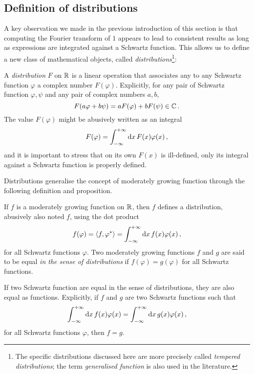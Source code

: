 \subsection{Definition of distributions}
A key observation we made in the previous introduction of this section is that computing
the Fourier transform of $1$ appears to lead to consistent results as long as expressions
are integrated against a Schwartz function. This allows us to define a new class of
mathematical objects, called \emph{distributions}\footnote{The specific distributions
  discussed here are more precisely called \emph{tempered distributions}; the term
\emph{generalised function} is also used in the literature.}:
\begin{definition}
  A \emph{distribution} $F$ on $\mathbb{R}$ is a linear operation that associates any to any
  Schwartz function $\varphi$ a complex number $F(\varphi)$. Explicitly, for any pair of
  Schwartz function $\varphi,\psi$ and any pair of complex numbers $a,b$,
  \begin{equation}
    F(a\varphi+b\psi)=aF(\varphi)+bF(\psi)\in\mathbb{C}\,.
  \end{equation}
  The value $F(\varphi)$ might be abusively written as an integral
  \begin{equation}
    F(\varphi)=\int_{-\infty}^{+\infty}\mathrm{d}{x}\,F(x)\varphi(x)\,,
  \end{equation}
  and it is important to stress that on its own $F(x)$ is ill-defined, only its integral
  against a Schwartz function is properly defined.
\end{definition}
Distributions generalise the concept of moderately growing function through the following
definition and proposition.
\begin{definition}
  If $f$ is a moderately growing function on $\mathbb{R}$, then $f$ defines a distribution,
  abusively also noted $f$, using the dot product
  \begin{equation}
    f(\varphi)=\braket{f,\varphi^*}=\int_{-\infty}^{+\infty}\mathrm{d}{x}\,f(x)\varphi(x)\,,
  \end{equation}
  for all Schwartz functions $\varphi$. Two moderately growing functions $f$ and $g$ are
  said to be equal \emph{in the sense of distributions} if $f(\varphi)=g(\varphi)$ for all
  Schwartz functions.
\end{definition}
\begin{proposition}
  If two Schwartz function are equal in the sense of distributions, they are also equal as
  functions. Explicitly, if $f$ and $g$ are two Schwartz functions such that
  \begin{equation}
    \int_{-\infty}^{+\infty}\mathrm{d}{x}\,f(x)\varphi(x)=\int_{-\infty}^{+\infty}\mathrm{d}{x}\,g(x)\varphi(x)\,,
  \end{equation}
  for all Schwartz functions $\varphi$, then $f=g$.
\end{proposition}
